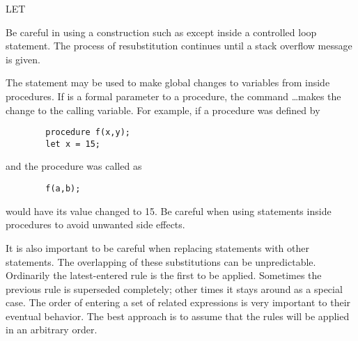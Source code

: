 \begin{Command}[let]{LET}
\begin{Comments}
Be careful in using a construction such as  except inside
a controlled loop statement.  The process of resubstitution continues until 
a stack overflow message is given.  

The  statement may be used to make global changes to variables from
inside procedures.  If  is a formal parameter to a procedure, the 
command \ldots makes the change to the calling variable.  
For example, if a procedure was defined by 
\begin{verbatim}
        procedure f(x,y);
        let x = 15;
\end{verbatim}
and the procedure was called as
\begin{verbatim}
        f(a,b);
\end{verbatim}
 would have its value changed to 15.  Be careful when using 
statements inside procedures to avoid unwanted side effects.

It is also important to be careful when replacing  statements with
other  statements.  The overlapping of these substitutions can be
unpredictable.  Ordinarily the latest-entered rule is the first to be applied.
Sometimes the previous rule is superseded completely; other times it stays
around as a special case.  The order of entering a set of related 
expressions is very important to their eventual behavior.  The best
approach is to assume that the rules will be applied in an arbitrary order.
\end{Comments}
\end{Command}


